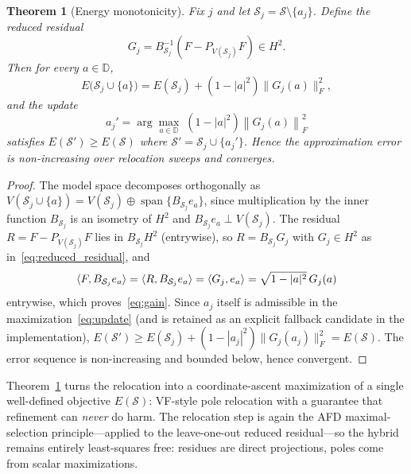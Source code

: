 \documentclass[journal]{IEEEtran}%
\newtheorem{theorem}{Theorem}
\newcommand{\inner}[2]{\braket{#1,#2}}
\begin{document}
\begin{theorem}[Energy monotonicity]\label{thm:monotone}
Fix $j$ and let $\mathcal{S}_j = \mathcal{S}\setminus\{a_j\}$. Define the reduced residual
\begin{equation}\label{eq:reduced_residual}
  G_j = B_{\mathcal{S}_j}^{-1}\left( F - P_{V(\mathcal{S}_j)} F \right) \in H^2 .
\end{equation}
Then for every $a \in \mathbb{D}$,
\begin{equation}\label{eq:gain}
  E\big(\mathcal{S}_j \cup \{a\}\big) = E(\mathcal{S}_j) + \left(1-|a|^2\right)\big\| G_j(a) \big\|_F^2 ,
\end{equation}
and the update
\begin{equation}\label{eq:update}
  a_j' = \arg\max_{a \in \mathbb{D} }\; \left(1-|a|^2\right)\left\| G_j(a) \right\|_F^2
\end{equation}
satisfies $E(\mathcal{S}') \geq E(\mathcal{S})$ where $\mathcal{S}' = \mathcal{S}_j \cup \{a_j'\}$. Hence the approximation error is non-increasing over relocation sweeps and converges.
\end{theorem}

\begin{proof}
The model space decomposes orthogonally as $V(\mathcal{S}_j \cup \{a\}) = V(\mathcal{S}_j) \oplus \operatorname{span}\{ B_{\mathcal{S}_j} e_a \}$, since multiplication by the inner function $B_{\mathcal{S}_j}$ is an isometry of $H^2$ and $B_{\mathcal{S}_j} e_a \perp V(\mathcal{S}_j)$. The residual $R = F - P_{V(\mathcal{S}_j)}F$ lies in $B_{\mathcal{S}_j} H^2$ (entrywise), so $R = B_{\mathcal{S}_j} G_j$ with $G_j \in H^2$ as in~\eqref{eq:reduced_residual}, and
\begin{equation}
  \inner{F}{B_{\mathcal{S}_j} e_a} = \inner{R}{B_{\mathcal{S}_j} e_a} = \inner{G_j}{e_a} = \sqrt{1-|a|^2}\, G_j(a)
\end{equation}
entrywise, which proves~\eqref{eq:gain}. Since $a_j$ itself is admissible in the maximization~\eqref{eq:update} (and is retained as an explicit fallback candidate in the implementation), $E(\mathcal{S}') \geq E(\mathcal{S}_j) + (1-|a_j|^2)\|G_j(a_j)\|_F^2 = E(\mathcal{S})$. The error sequence is non-increasing and bounded below, hence convergent.
\end{proof}

Theorem~\ref{thm:monotone} turns the relocation into a coordinate-ascent maximization of a single well-defined objective $E(\mathcal{S})$: VF-style pole relocation with a guarantee that refinement can \emph{never} do harm. The relocation step is again the AFD maximal-selection principle---applied to the leave-one-out reduced residual---so the hybrid remains entirely least-squares free: residues are direct projections, poles come from scalar maximizations.
\end{document}
